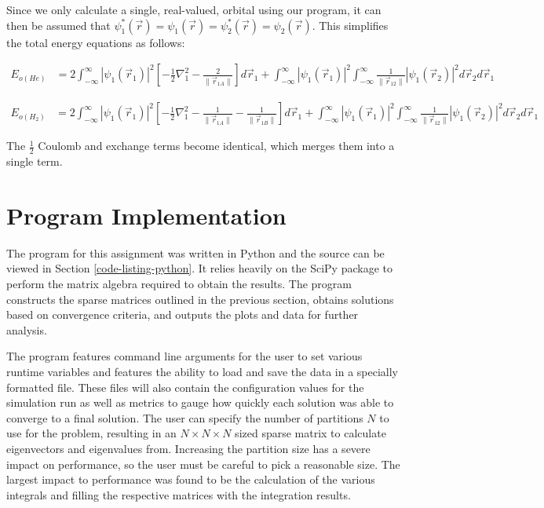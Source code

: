 \documentclass[10pt, oneside, letterpaper]{article}
\begin{document}
Since we only calculate a single, real-valued, orbital using our program, it can then be assumed that $\psi_1^\ast(\vec{r}) = \psi_1(\vec{r}) = \psi_2^\ast(\vec{r}) = \psi_2(\vec{r})$. This simplifies the total energy equations as follows:

\begin{align*}
  E_{o(He)} &= 2\int_{-\infty}^{\infty} \left|\psi_1(\vec{r}_1)\right|^2 \left[ -\frac{1}{2}\nabla_1^2 - \frac{2}{\|\vec{r}_{1 A}\|} \right] d\vec{r}_1 + 
   \int_{-\infty}^{\infty} \left|\psi_1(\vec{r}_1)\right|^2 \int_{-\infty}^{\infty} \frac{1}{\|\vec{r}_{12}\|} \left|\psi_1(\vec{r}_2)\right|^2 d\vec{r}_2d\vec{r}_1
\end{align*}

\begin{align*}
  E_{o(H_2)} &= 2\int_{-\infty}^{\infty} \left|\psi_1(\vec{r}_1)\right|^2 \left[ -\frac{1}{2}\nabla_1^2 - \frac{1}{\|\vec{r}_{1 A}\|} - \frac{1}{\|\vec{r}_{1 B}\|} \right] d\vec{r}_1 +
   \int_{-\infty}^{\infty} \left|\psi_1(\vec{r}_1)\right|^2 \int_{-\infty}^{\infty} \frac{1}{\|\vec{r}_{12}\|} \left|\psi_1(\vec{r}_2)\right|^2 d\vec{r}_2d\vec{r}_1
\end{align*}

The $\frac{1}{2}$ Coulomb and exchange terms become identical, which merges them into a single term.

\newpage
\section{Program Implementation}

The program for this assignment was written in Python and the source can be viewed in Section \ref{code-listing-python}. It relies heavily on the SciPy package to perform the matrix algebra required to obtain the results. The program constructs the sparse matrices outlined in the previous section, obtains solutions based on convergence criteria, and outputs the plots and data for further analysis.

The program features command line arguments for the user to set various runtime variables and features the ability to load and save the data in a specially formatted file. These files will also contain the configuration values for the simulation run as well as metrics to gauge how quickly each solution was able to converge to a final solution. The user can specify the number of partitions $N$ to use for the problem, resulting in an $N \times N \times N$ sized sparse matrix to calculate eigenvectors and eigenvalues from. Increasing the partition size has a severe impact on performance, so the user must be careful to pick a reasonable size. The largest impact to performance was found to be the calculation of the various integrals and filling the respective matrices with the integration results.
\end{document}
